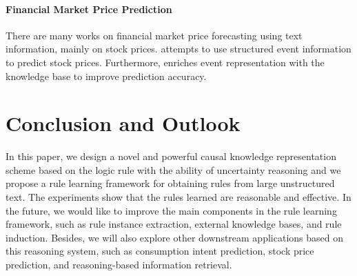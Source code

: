 \paragraph{Financial Market Price Prediction} There are many works on financial market price forecasting using text information, mainly on stock prices. \cite{Ding} attempts to use structured event information to predict stock prices. 
Furthermore, \cite{Ding2016} enriches event representation with the knowledge base to improve prediction accuracy.
\section{Conclusion and Outlook}
\label{sec:conclusion}

In this paper, we design a novel and powerful causal knowledge representation scheme based on the logic rule with the ability of uncertainty reasoning and we propose a rule learning framework for obtaining rules from large unstructured text. The experiments show that the rules learned are reasonable and effective.
In the future, we would like to improve the main components in the rule learning framework, such as rule instance extraction, external knowledge bases, and rule induction. Besides, we will also explore other downstream applications based on this reasoning system, such as consumption intent prediction, stock price prediction, and reasoning-based information retrieval.




